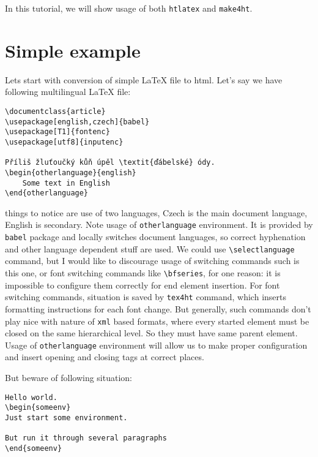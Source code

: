In this tutorial, we will show usage of both \texttt{htlatex} and
\texttt{make4ht}.

\hypertarget{simple-example}{%
\section{Simple example}\label{simple-example}}

Lets start with conversion of simple LaTeX file to html. Let's say we
have following multilingual LaTeX file:

\begin{verbatim}
\documentclass{article}
\usepackage[english,czech]{babel}
\usepackage[T1]{fontenc}
\usepackage[utf8]{inputenc}

Příliš žluťoučký kůň úpěl \textit{ďábelské} ódy.
\begin{otherlanguage}{english}
    Some text in English
\end{otherlanguage}

\end{verbatim}

things to notice are use of two languages, Czech is the main document
language, English is secondary. Note usage of \texttt{otherlanguage}
environment. It is provided by \texttt{babel} package and locally
switches document languages, so correct hyphenation and other language
dependent stuff are used. We could use
\texttt{\textbackslash{}selectlanguage} command, but I would like to
discourage usage of switching commands such is this one, or font
switching commands like \texttt{\textbackslash{}bfseries}, for one
reason: it is impossible to configure them correctly for end element
insertion. For font switching commands, situation is saved by
\texttt{tex4ht} command, which inserts formatting instructions for each
font change. But generally, such commands don't play nice with nature of
\texttt{xml} based formats, where every started element must be closed
on the same hierarchical level. So they must have same parent element.
Usage of \texttt{otherlanguage} environment will allow us to make proper
configuration and insert opening and closing tags at correct places.

But beware of following situation:

\begin{verbatim}
Hello world.
\begin{someenv}
Just start some environment.

But run it through several paragraphs
\end{someenv}
\end{verbatim}

